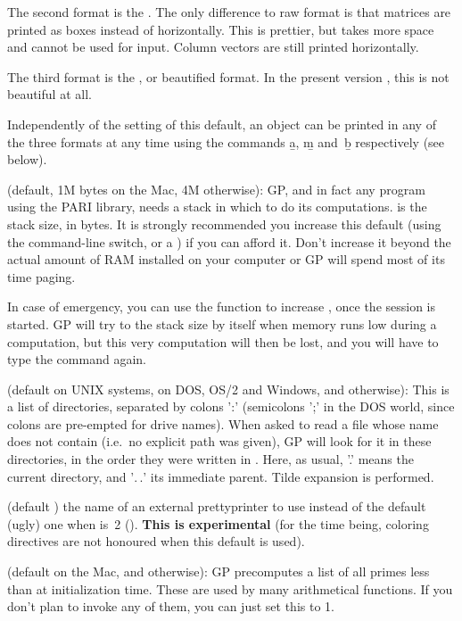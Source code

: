 The second format is the . The only difference to
raw format is that matrices are printed as boxes instead of horizontally.
This is prettier, but takes more space and cannot be used for input. Column
vectors are still printed horizontally.

The third format is the , or beautified format. In
the present version \vers, this is not beautiful at all.

Independently of the setting of this default, an object can be printed
in any of the three formats at any time using the commands \b{a}, \b{m}
and~\b{b} respectively (see below).

 (default, 1M bytes on the Mac, 4M otherwise): GP, and
in fact any program using the PARI library, needs a stack in which to do
its computations.  is the stack size, in bytes. It is
strongly recommended you increase this default (using the 
command-line switch, or a ) if you can afford it. Don't increase
it beyond the actual amount of RAM installed on your computer or GP will
spend most of its time paging.

In case of emergency, you can use the  function to
increase , once the session is started. GP will try to
 the stack size by itself when memory runs low during a
computation, but this very computation will then be lost, and you will have
to type the command again.

 (default  on UNIX systems,
 on DOS, OS/2 and Windows, and  otherwise):
This is a list of directories, separated by colons ':' (semicolons ';' in the
DOS world, since colons are pre-empted for drive names). When asked to read a
file whose name does not contain \kbd{/} (i.e.~no explicit path was given),
GP will look for it in these directories, in the order they were written in
. Here, as usual, '.' means the current directory, and '$.\,.$' its
immediate parent. Tilde expansion is performed.

 (default ) the name of an external
prettyprinter to use instead of the default (ugly) one when 
is~2 (). {\bf This is experimental} (for the time being,
coloring directives are not honoured when this default is used).

 (default  on the Mac, and 
otherwise): GP precomputes a list of all primes less than 
at initialization time. These are used by many arithmetical functions. If
you don't plan to invoke any of them, you can just set this to 1.

